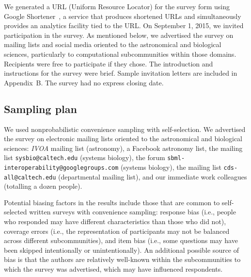 \documentclass{casicswhitepaper}
\begin{document}
We generated a URL (Uniform Resource Locator) for the survey form using Google Shortener~\cite{googl}, a service that produces shortened URLs and simultaneously provides an analytics facility tied to the URL.  On September 1, 2015, we invited participation in the survey.  As mentioned below, we advertised the survey on mailing lists and social media oriented to the astronomical and biological sciences, particularly to computational subcommunities within those domains.  Recipients were free to participate if they chose.  The introduction and instructions for the survey were brief.  Sample invitation letters are included in Appendix~B.  The survey had no express closing date.


\subsection{Sampling plan}
\label{sampling-plan}

%

\newcommand{\totalPotentialRecipients}{2300\xspace}
\newcommand{\totalClicks}{172\xspace}
\newcommand{\accessRate}{7.5\%\xspace}
\newcommand{\populationResponseRate}{3\%\xspace}
\newcommand{\completionRate}{40\%\xspace}

We used nonprobabilistic convenience sampling with self-selection.  We   advertised the survey on electronic mailing lists oriented to the astronomical and biological sciences: \emph{IVOA} mailing list (astronomy), a Facebook astronomy list, the mailing list \texttt{sysbio@caltech.edu} (systems biology), the forum \texttt{sbml-interoperability@googlegroups.com} (systems biology), the mailing list \texttt{cds-all@caltech.edu} (departmental mailing list), and our immediate work colleagues (totalling a dozen people).

Potential biasing factors in the results include those that are common to self-selected written surveys with convenience sampling: response bias (i.e., people who responded may have different characteristics than those who did not), coverage errors (i.e., the representation of participants may not be balanced across different subcommunities), and item bias (i.e., some questions may have been skipped intentionally or unintentionally).  An additional possible source of bias is that the authors are relatively well-known within the subcommunities to which the survey was advertised, which may have influenced respondents.  
\end{document}
